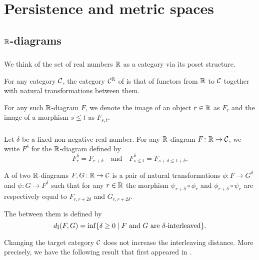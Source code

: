 
\section{Persistence and metric spaces}


\subsection{$\mathbb{R}$-diagrams}

\subsubsection{}

We think of the set of real numbers $\mathbb{R}$ as a category via its poset structure.

For any category $\mathcal{C}$, the category $\mathcal{C}^{\mathbb{R}}$ of  is that of functors from $\mathbb{R}$ to $\mathcal{C}$ together with natural transformations between them.

For any such $\mathbb{R}$-diagram $F$, we denote the image of an object $r \in \mathbb{R}$ as $F_r$ and the image of a morphism $s \leq t$ as $F_{s,t}$.

\subsubsection{}\label{ss:interleaving}

Let $\delta$ be a fixed non-negative real number.
For any $\mathbb{R}$-diagram $F \colon \mathbb{R} \to \mathcal{C}$, we write $F^\delta$ for the $\mathbb{R}$-diagram defined by
\[
F^\delta_r = F_{r+\delta}
\quad\text{and}\quad
F^\delta_{s \leq t} = F_{s+\delta \leq t+\delta}.
\]

A  of two $\mathbb{R}$-diagrams $F,G \colon \mathbb{R} \to \mathcal{C}$ is a pair of natural transformations
$\phi \colon F \to G^\delta$ and $\psi \colon G \to F^\delta$ such that for any $r \in \mathbb{R}$ the morphism $\psi_{r+\delta} \circ \phi_r$ and $\phi_{r+\delta} \circ \psi_r$ are respectively equal to $F_{r,r+2\delta}$ and $G_{r,r+2\delta}$.

The  between them is defined by
\[
d_{\mathrm{I}}(F, G) = \inf\{\delta \geq 0 \mid F \text{ and } G \text{ are } \delta\text{-interleaved}\}.
\]

Changing the target category $\mathcal{C}$ does not increase the interleaving distance.
More precisely, we have the following result that first appeared in \cite[p.~1508]{bubenik2015metrics}.

